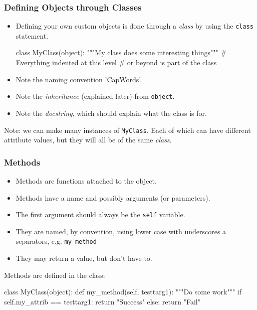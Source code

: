 \documentclass{beamer}
\begin{document}
\begin{frame}[fragile]
\frametitle{Defining Objects through Classes}
\begin{itemize}
\item Defining your own custom objects is done through a \emph{class}
by using the \lstinline|class| statement.
\begin{code}
class MyClass(object):
  """My class does some interesting things"""
  # Everything indented at this level 
  # or beyond is part of the class
\end{code}
\item Note the naming convention 'CapWords'.
\item Note the \emph{inheritance} (explained later) from \lstinline|object|.
\item Note the \emph{docstring}, which should explain what the class is for.
\end{itemize}
Note: we can make many instances of \lstinline|MyClass|. 
Each of which can have different attribute values,
but they will all be of the same \emph{class}.

\end{frame}

\begin{frame}[fragile]
\frametitle{Methods}
\begin{itemize}
\item Methods are functions attached to the object.
\item Methods have a name and possibly arguments (or parameters).
\item The first argument should always be the \lstinline|self| variable.
\item They are named, by convention, using lower case with underscores a separators, 
e.g. \lstinline|my_method|
\item They may return a value, but don't have to.
\end{itemize}
Methods are defined in the class:
\begin{code}
class MyClass(object):
  def my_method(self, testtarg1):
    """Do some work"""
    if self.my_attrib == testtarg1:
    	return "Success"
    else:
    	return "Fail"
\end{code}

\end{frame}
\end{document}
